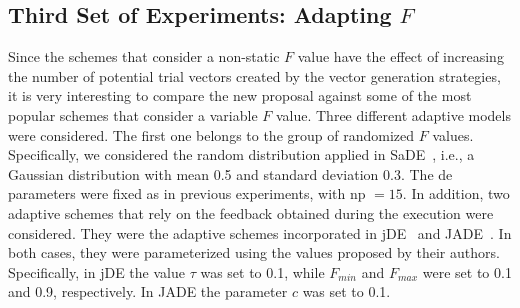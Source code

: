 \documentclass[review,3p]{elsarticle}
\newcommand{\CDE}{c{\sc de}}
\newcommand{\DE}{{\sc de}}
\newcommand{\NP}{{\sc np}}
\begin{document}



\subsection{Third Set of Experiments: Adapting $F$}

Since the schemes that consider a non-static $F$ value have the effect of increasing the number of potential trial vectors created
by the vector generation strategies, it is very interesting to compare the new proposal against some of the most popular schemes
that consider a variable $F$ value.
%
Three different adaptive models were considered.
%
The first one belongs to the group of randomized $F$ values.
%
Specifically, we considered the random distribution applied in SaDE~\cite{Qin:09}, i.e., a Gaussian distribution
with mean 0.5 and standard deviation 0.3.
%
The \DE{} parameters were fixed as in previous experiments, with \NP{} $= 15$.
%
In addition, two adaptive schemes that rely on the feedback obtained during the execution were considered.
%
They were the adaptive schemes incorporated in jDE~\cite{Brest:06} and JADE~\cite{Zhang:09}.
%
In both cases, they were parameterized using the values proposed by their authors.
%
Specifically, in jDE the value $\tau$ was set to 0.1, while $F_{min}$ and $F_{max}$ were set to 0.1 and 0.9, respectively.
%
In JADE the parameter $c$ was set to 0.1.
%


%




\end{document}
